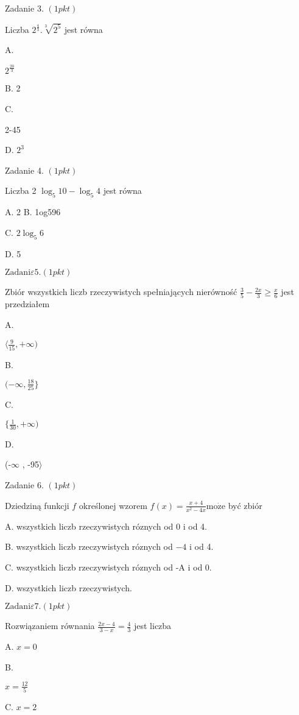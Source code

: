 \documentclass[a4paper,12pt]{article}
\begin{document}
Zadanie 3. $(1pkt)$

Liczba $2^{\frac{4}{3}}. \sqrt[3]{2^{5}}$ jest równa

A.

$2^{\frac{20}{3}}$

B. 2

C.

2-45

D. $2^{3}$

Zadanie 4. $(1pkt)$

Liczba 2 $\log_{5}10-\log_{5}4$ jest równa

A. 2 B. 1og596

C. $2\log_{5}6$

D. 5

$\mathrm{Z}\mathrm{a}\mathrm{d}\mathrm{a}\mathrm{n}\mathrm{i}\varepsilon 5. (1pkt)$

Zbiór wszystkich liczb rzeczywistych spełniających nierówność $\displaystyle \frac{3}{5}-\frac{2x}{3}\geq\frac{x}{6}$ jest przedziałem

A.

$\displaystyle \langle\frac{9}{15},+\infty)$

B.

$(-\displaystyle \infty,\frac{18}{25}\}$

C.

$\displaystyle \{\frac{1}{30},+\infty)$

D.

(-$\infty$ , -95$\rangle$

Zadanie 6. $(1pkt)$

Dziedziną funkcji $f$ określonej wzorem $f(x)=\displaystyle \frac{x+4}{x^{2}-4x}\mathrm{m}\mathrm{o}\dot{\mathrm{z}}\mathrm{e}$ być zbiór

A. wszystkich liczb rzeczywistych róznych od 0 i od 4.

B. wszystkich liczb rzeczywistych róznych od $-4$ i od 4.

C. wszystkich liczb rzeczywistych róznych od -A i od 0.

D. wszystkich liczb rzeczywistych.

$\mathrm{Z}\mathrm{a}\mathrm{d}\mathrm{a}\mathrm{n}\mathrm{i}\varepsilon 7. (1pkt)$

Rozwiązaniem równania $\displaystyle \frac{2x-4}{3-x}=\frac{4}{3}$ jest liczba

A. $x=0$

B.

$x=\displaystyle \frac{12}{5}$

C. $x=2$
\end{document}
